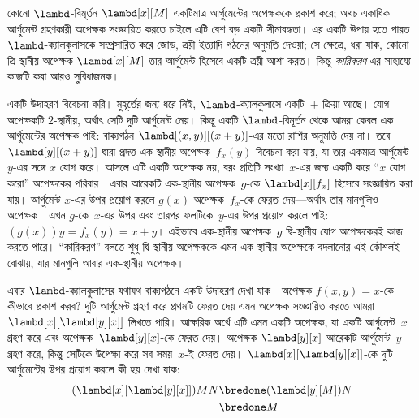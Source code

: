 \documentclass[../../../include/open-logic-section]{subfiles}
\begin{document}

কোনো $\lambd$-বিমূর্তন $\lambd[x][M]$ একটিমাত্র আর্গুমেন্টের অপেক্ষককে
প্রকাশ করে; অথচ একাধিক আর্গুমেন্ট গ্রহণকারী অপেক্ষক সংজ্ঞায়িত করতে চাইলে
এটি বেশ বড় একটি সীমাবদ্ধতা। এর একটি উপায় হতে পারত $\lambd$-ক্যালকুলাসকে
সম্প্রসারিত করে জোড়, ত্রয়ী ইত্যাদি গঠনের অনুমতি দেওয়া; সে ক্ষেত্রে,
ধরা যাক, কোনো ত্রি-স্থানীয় অপেক্ষক $\lambd[x][M]$ তার আর্গুমেন্ট হিসেবে
একটি ত্রয়ী আশা করত। কিন্তু \emph{কারিকরণ}-এর সাহায্যে কাজটি করা আরও
সুবিধাজনক।

একটি উদাহরণ বিবেচনা করি। মুহূর্তের জন্য ধরে নিই, $\lambd$-ক্যালকুলাসে
একটি~$+$ ক্রিয়া আছে। যোগ অপেক্ষকটি $2$-স্থানীয়, অর্থাৎ সেটি দুটি
আর্গুমেন্ট নেয়। কিন্তু একটি $\lambd$-বিমূর্তন থেকে আমরা কেবল এক
আর্গুমেন্টের অপেক্ষক পাই: বাক্যগঠন $\lambd[(x,y)][(x+y)]$-এর মতো রাশির
অনুমতি দেয় না। তবে $\lambd[y][(x+y)]$ দ্বারা প্রদত্ত এক-স্থানীয়
অপেক্ষক~$f_x(y)$ বিবেচনা করা যায়, যা তার একমাত্র আর্গুমেন্ট~$y$-এর সঙ্গে
$x$ যোগ করে। আসলে এটি একটি অপেক্ষক নয়, বরং প্রতিটি সংখ্যা~$x$-এর জন্য
একটি করে ``$x$ যোগ করো'' অপেক্ষকের পরিবার। এবার আরেকটি এক-স্থানীয়
অপেক্ষক~$g$-কে $\lambd[x][f_x]$ হিসেবে সংজ্ঞায়িত করা যায়। আর্গুমেন্ট
$x$-এর উপর প্রয়োগ করলে $g(x)$ অপেক্ষক~$f_x$-কে ফেরত দেয়---অর্থাৎ তার
মানগুলিও অপেক্ষক। এখন $g$-কে~$x$-এর উপর এবং তারপর ফলটিকে~$y$-এর উপর
প্রয়োগ করলে পাই: $(g(x))y = f_x(y) = x+y$। এইভাবে এক-স্থানীয়
অপেক্ষক~$g$ দ্বি-স্থানীয় যোগ অপেক্ষকেরই কাজ করতে পারে। ``কারিকরণ'' বলতে
শুধু দ্বি-স্থানীয় অপেক্ষককে এমন এক-স্থানীয় অপেক্ষকে বদলানোর এই কৌশলই
বোঝায়, যার মানগুলি আবার এক-স্থানীয় অপেক্ষক।

এবার $\lambd$-ক্যালকুলাসের যথাযথ বাক্যগঠনে একটি উদাহরণ দেখা যাক। অপেক্ষক
$f(x,y) = x$-কে কীভাবে প্রকাশ করব? দুটি আর্গুমেন্ট গ্রহণ করে প্রথমটি
ফেরত দেয় এমন অপেক্ষক সংজ্ঞায়িত করতে আমরা
$\lambd[x][\lambd[y][x]]$ লিখতে পারি। আক্ষরিক অর্থে এটি এমন একটি অপেক্ষক,
যা একটি আর্গুমেন্ট~$x$ গ্রহণ করে এবং অপেক্ষক~$\lambd[y][x]$-কে ফেরত দেয়।
অপেক্ষক $\lambd[y][x]$ আরেকটি আর্গুমেন্ট~$y$ গ্রহণ করে, কিন্তু সেটিকে
উপেক্ষা করে সব সময়~$x$-ই ফেরত দেয়। $\lambd[x][\lambd[y][x]]$-কে দুটি
আর্গুমেন্টের উপর প্রয়োগ করলে কী হয় দেখা যাক:
\begin{align*}
  (\lambd[x][\lambd[y][x]])MN 
  \bredone & (\lambd[y][M])N \\
  \bredone & M
\end{align*}
\end{document}
